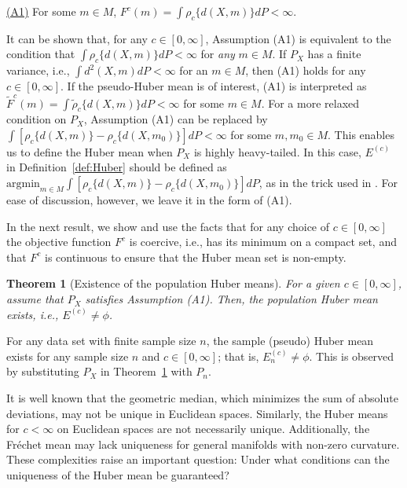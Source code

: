 \documentclass[preprint]{imsart}
\theoremstyle{plain}
\newtheorem{theorem}{Theorem}
\theoremstyle{remark}
\begin{document}
\indent \underline{(A1)} For some $m \in M$, $F^c(m) = \int \rho_{c}\{d(X, m)\}dP < \infty$. 

It can be shown that, for any $c \in [0, \infty]$, Assumption (A1) is equivalent to the condition that $\int \rho_{c}\{d(X, m)\}dP < \infty$ for \textit{any} $m \in M$.
If $P_X$ has a finite variance, i.e., $\int d^2(X, m)dP < \infty$ for an $m\in M$, then (A1) holds for any $c \in [0, \infty]$. If the pseudo-Huber mean is of interest, (A1) is interpreted as $\tilde{F}^c(m) = \int \tilde{\rho}_{c}\{d(X, m)\}dP < \infty$ for some $m \in M$. For a more relaxed condition on $P_{X}$, Assumption (A1) can be replaced by $\int [\rho_{c}\{d(X, m)\} - \rho_c\{d(X, m_0)\}]dP < \infty$ for some $m, m_0\in M$. This enables us to define the Huber mean when $P_{X}$ is highly heavy-tailed. In this case, $E^{(c)}$ in Definition~\ref{def:Huber} should be defined as $\mbox{argmin}_{m \in M} \int [\rho_c\{d(X, m)\} - \rho_c\{d(X, m_0)\}]dP$, as in the trick used in \cite{sturm2003probability}. For ease of discussion, however, we leave it in the form of (A1).

 In the next result, we show and use the facts that for any choice of $c \in [0,\infty]$ the objective function $F^{c}$ is coercive, i.e., has its minimum on a compact set, and that $F^c$ is continuous  to ensure that the Huber mean set is non-empty. 



\begin{theorem}[Existence of the population Huber means]\label{thm:exist}
For a given $c \in [0, \infty]$, assume that $P_{X}$ satisfies Assumption (A1). Then, the population Huber mean exists, i.e., $E^{(c)} \neq \phi$.
\end{theorem}


For any data set with finite sample size $n$, the sample (pseudo) Huber mean exists for any sample size $n$ and $c \in [0,\infty]$; that is, $E_{n}^{(c)} \neq \phi$. This is observed by substituting $P_{X}$ in Theorem~\ref{thm:exist} with $P_{n}$. 



It is well known that the geometric median, which minimizes the sum of absolute deviations, may not be unique in Euclidean spaces. Similarly, the Huber means for $c < \infty$  on Euclidean spaces are not necessarily unique. Additionally,  the Fr\'{e}chet mean may lack uniqueness for general manifolds with non-zero curvature. These complexities raise an important question: Under what conditions can the uniqueness of the Huber mean be guaranteed?
\end{document}
